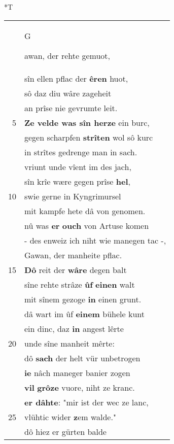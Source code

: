 \documentclass[8pt,a4paper,notitlepage]{article}
\begin{document}
\begin{table}[ht]
\begin{minipage}[t]{0.5\linewidth}
\end{minipage}
\hspace{0.5cm}
\begin{minipage}[t]{0.5\linewidth}
\small
\begin{center}*T
\end{center}
\begin{tabular}{rl}
 & \begin{large}G\end{large}awan, der rehte gemuot,\\ 
 & sîn ellen pflac der \textbf{êren} huot,\\ 
 & sô daz diu wâre zageheit\\ 
 & an prîse nie gevrumte leit.\\ 
5 & \textbf{Ze velde was sîn herze} ein burc,\\ 
 & gegen scharpfen \textbf{strîten} wol sô kurc\\ 
 & in strîtes gedrenge man in sach.\\ 
 & vriunt unde vîent im des jach,\\ 
 & sîn krîe wære gegen prîse \textbf{hel},\\ 
10 & swie gerne in Kyngrimursel\\ 
 & mit kampfe hete dâ von genomen.\\ 
 & nû was \textbf{er} \textbf{ouch} von Artuse komen\\ 
 & - des enweiz ich niht wie manegen tac -,\\ 
 & Gawan, der manheite pflac.\\ 
15 & \textbf{Dô} reit der \textbf{wâre} degen balt\\ 
 & sîne rehte strâze \textbf{ûf} \textbf{einen} walt\\ 
 & mit sînem gezoge \textbf{in} einen grunt.\\ 
 & dâ wart im ûf \textbf{einem} bühele kunt\\ 
 & ein dinc, daz \textbf{in} angest lêrte\\ 
20 & unde sîne manheit mêrte:\\ 
 & dô \textbf{sach} der helt vür unbetrogen\\ 
 & \textbf{ie} nâch maneger banier zogen\\ 
 & \textbf{vil} \textbf{grôze} vuore, niht ze kranc.\\ 
 & \textbf{er dâhte}: "mir ist der wec ze lanc,\\ 
25 & vlühtic wider \textbf{z}em walde."\\ 
 & dô hiez er gürten balde\\ 

\end{tabular}
\end{minipage}
\end{table}
\end{document}
